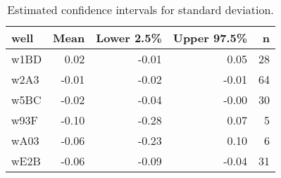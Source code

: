 \begin{table}[ht]
\centering
\begin{tabular}{lrrrr}
  \hline
well & Mean & Lower 2.5\% & Upper 97.5\% & n \\ 
  \hline
w1BD & 0.02 & -0.01 & 0.05 &  28 \\ 
  w2A3 & -0.01 & -0.02 & -0.01 &  64 \\ 
  w5BC & -0.02 & -0.04 & -0.00 &  30 \\ 
  w93F & -0.10 & -0.28 & 0.07 &   5 \\ 
  wA03 & -0.06 & -0.23 & 0.10 &   6 \\ 
  wE2B & -0.06 & -0.09 & -0.04 &  31 \\ 
   \hline
\end{tabular}
\caption{Estimated confidence intervals for standard deviation.} 
\label{tab:sd}
\end{table}
